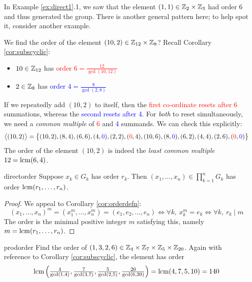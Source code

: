 
In Example \ref{ex:direct1}.1, we saw that the element $(1,1)\in\mathbb{Z}_2\times\mathbb{Z}_3$ had order 6 and thus generated the group. There is another general pattern here; to help spot it, consider another example.

\begin{example}{}{}
	We find the order of the element $(10,2)\in\mathbb{Z}_{12}\times \mathbb{Z}_8$? Recall Corollary \ref{cor:subscyclic}:
	\begin{itemize}\itemsep0pt
	  \item $10\in\mathbb{Z}_{12}$ has \textcolor{red}{order $6=\frac{12}{\gcd(10,12)}$}
	  \item $2\in\mathbb{Z}_8$ has \textcolor{blue}{order $4=\frac 8{\gcd(2,8)}$}
	\end{itemize}
	If we repeatedly add $(10,2)$ to itself, then the \textcolor{red}{first co-ordinate resets after 6} summations, whereas the \textcolor{blue}{second resets after 4}. For \emph{both} to reset simultaneously, we need a \emph{common multiple} of \textcolor{red}{6} and \textcolor{blue}{4} summands. We can check this explicitly:
	\[
		\bigl\langle(10,2)\bigr\rangle = \bigl\{(10,2), (8,4), (6,6), (4,\textcolor{blue}{0}), (2,2), (\textcolor{red}{0},4), (10,6), (8,\textcolor{blue}{0}), (6,2), (4,4), (2,6), (\textcolor{red}{0},\textcolor{blue}{0})\bigr\}
	\]
	The order of the element $(10,2)$ is indeed the \emph{least common multiple} $12=\operatorname{lcm}(6,4)$.
\end{example}


\begin{thm}{}{directorder}
	Suppose $x_k\in G_k$ has order $r_k$. Then $(x_1,\ldots,x_n)\in \prod\limits_{k=1}^n G_k$ has order $\operatorname{lcm}(r_1,\ldots,r_n)$.
\end{thm}

\begin{proof}
	We appeal to Corollary \ref{cor:orderdefn}:
	\[
		(x_1,\ldots,x_n)^m=(x_1^m,\ldots,x_n^m)=(e_1,e_2,\ldots,e_n)
		\iff \forall k,\ x_k^m=e_k 
		\iff \forall k,\ r_k\mid m
	\]
	The order is the minimal positive integer $m$ satisfying this, namely $m=\operatorname{lcm}(r_1,\ldots,r_n)$.
\end{proof}



\begin{example}{}{prodorder}
	Find the order of $(1,3,2,6)\in\mathbb{Z}_4\times\mathbb{Z}_7\times\mathbb{Z}_5\times\mathbb{Z}_{20}$.\smallbreak
	Again with reference to Corollary \ref{cor:subscyclic}, the element has order
	\[
		\operatorname{lcm}\left(\tfrac 4{\gcd(1,4)}, \tfrac 7{\gcd(3,7)}, \tfrac 5{\gcd(2,5)}, \tfrac{20}{\gcd(6,20)}\right) =\operatorname{lcm}(4,7,5,10)=140
	\]
\end{example}


